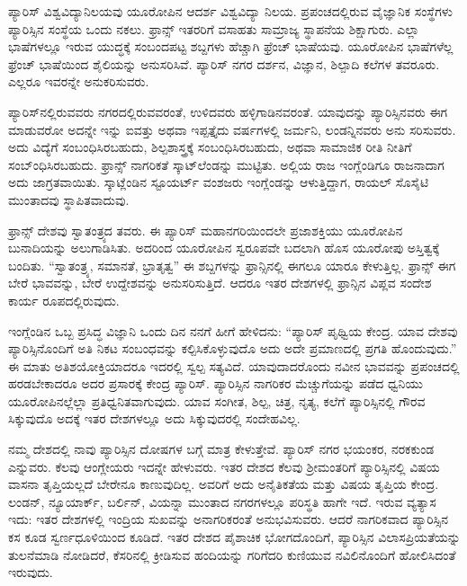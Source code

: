 \vskip 5pt

ಪ್ಯಾರಿಸ್​ ವಿಶ್ವವಿದ್ಯಾನಿಲಯವು ಯೂರೋಪಿನ ಆದರ್ಶ ವಿಶ್ವವಿದ್ಯಾ ನಿಲಯ. ಪ್ರಪಂಚದಲ್ಲಿರುವ ವೈಜ್ಞಾನಿಕ ಸಂಸ್ಥೆಗಳು ಪ್ಯಾರಿಸ್ಸಿನ ಸಂಸ್ಥೆಯ ಒಂದು ನಕಲು. ಫ್ರಾನ್ಸ್​ ಇತರರಿಗೆ ವಸಾಹತು ಸಾಮ್ರಾಜ್ಯ ಸ್ಥಾಪನೆಯ ಶಿಕ್ಷಾಗುರು. ಎಲ್ಲಾ ಭಾಷೆಗಳಲ್ಲೂ ಇರುವ ಯುದ್ಧಕ್ಕೆ ಸಂಬಂದಪಟ್ಟ ಶಬ್ದಗಳು ಹೆಚ್ಚಾಗಿ ಫ್ರೆಂಚ್​ ಭಾಷೆಯವು. ಯೂರೋಪಿನ ಭಾಷೆಗಳೆಲ್ಲ ಫ್ರೆಂಚ್​ ಭಾಷೆಯಿಂದ ಶೈಲಿಯನ್ನು ಅನುಸರಿಸಿವೆ. ಪ್ಯಾರಿಸ್​ ನಗರ ದರ್ಶನ, ವಿಜ್ಞಾನ, ಶಿಲ್ಪಾದಿ ಕಲೆಗಳ ತವರೂರು. ಎಲ್ಲರೂ ಇವರನ್ನೇ ಅನುಕರಿಸುವರು.

\vskip 5pt

ಪ್ಯಾರಿಸ್​ನಲ್ಲಿರುವವರು ನಗರದಲ್ಲಿರುವವರಂತೆ, ಉಳಿದವರು ಹಳ್ಳಿಗಾಡಿನವರಂತೆ. ಯಾವುದನ್ನು ಪ್ಯಾರಿಸ್ಸಿನವರು ಈಗ ಮಾಡುವರೋ ಅದನ್ನೇ ಇನ್ನು ಐವತ್ತು ಅಥವಾ ಇಪ್ಪತ್ತೈದು ವರ್ಷಗಳಲ್ಲಿ ಜರ್ಮನಿ, ಲಂಡನ್ನಿನವರು ಅನು ಸರಿಸುವರು. ಅದು ವಿದ್ಯೆಗೆ ಸಂಬಂಧಿಸಿರಬಹುದು, ಶಿಲ್ಪಶಾಸ್ತ್ರಕ್ಕೆ ಸಂಬಂಧಿಸಿರಬಹುದು, ಅಥವಾ ಸಾಮಾಜಿಕ ರೀತಿ ನೀತಿಗೆ ಸಂಬ್ಂಧಿಸಿರಬಹುದು. ಫ್ರಾನ್ಸ್​ ನಾಗರಿಕತೆ ಸ್ಕಾಟ್​ಲೆಂಡನ್ನು ಮುಟ್ಟಿತು. ಅಲ್ಲಿಯ ರಾಜ ಇಂಗ್ಲೆಂಡಿಗೂ ರಾಜನಾದಾಗ ಅದು ಜಾಗ್ರತವಾಯಿತು. ಸ್ಕಾಟ್ಲೆಂಡಿನ ಸ್ಟೂಯರ್ಟ್ ವಂಶಜರು ಇಂಗ್ಲೆಂಡನ್ನು ಆಳುತ್ತಿದ್ದಾಗ, ರಾಯಲ್​ ಸೊಸೈಟಿ ಮುಂತಾದವು ಸ್ಥಾಪಿತ\break ವಾದುವು.

ಫ್ರಾನ್ಸ್​ ದೇಶವು ಸ್ವಾತಂತ್ರ್ಯದ ತವರು. ಈ ಪ್ಯಾರಿಸ್​ ಮಹಾನಗರಿಯಿಂದಲೇ ಪ್ರಜಾ\break ಶಕ್ತಿಯು ಯೂರೋಪಿನ ಬುನಾದಿಯನ್ನು ಅಲುಗಾಡಿಸಿತು. ಅದರಿಂದ ಯೂರೋಪಿನ ಸ್ವರೂಪವೇ ಬದಲಾಗಿ ಹೊಸ ಯೂರೋಪು ಅಸ್ತಿತ್ವಕ್ಕೆ ಬಂದಿತು. “ಸ್ವಾತಂತ್ರ್ಯ, ಸಮಾನತೆ, ಭ್ರಾತೃತ್ವ” ಈ ಶಬ್ದಗಳನ್ನು ಫ್ರಾನ್ಸಿನಲ್ಲಿ ಈಗಲೂ ಯಾರೂ ಕೇಳುತ್ತಿಲ್ಲ. ಫ್ರಾನ್ಸ್​ ಈಗ ಬೇರೆ ಭಾವವನ್ನು, ಬೇರೆ ಉದ್ದೇಶವನ್ನು ಅನುಸರಿಸುತ್ತಿದೆ. ಆದರೂ ಇತರ ದೇಶಗಳಲ್ಲಿ ಫ್ರಾನ್ಸಿನ ವಿಪ್ಲವ ಸಂದೇಶ ಕಾರ್ಯ ರೂಪದಲ್ಲಿರುವುದು.

ಇಂಗ್ಲೆಂಡಿನ ಒಬ್ಬ ಪ್ರಸಿದ್ಧ ವಿಜ್ಞಾನಿ ಒಂದು ದಿನ ನನಗೆ ಹೀಗೆ ಹೇಳಿದನು: “ಪ್ಯಾರಿಸ್​ ಪೃಥ್ವಿಯ ಕೇಂದ್ರ. ಯಾವ ದೇಶವು ಪ್ಯಾರಿಸ್ಸಿನೊಂದಿಗೆ ಅತಿ ನಿಕಟ ಸಂಬಂಧವನ್ನು ಕಲ್ಪಿಸಿಕೊಳ್ಳುವುದೊ ಅದು ಅದೇ ಪ್ರಮಾಣದಲ್ಲಿ ಪ್ರಗತಿ ಹೊಂದುವುದು.” ಈ ಮಾತು ಅತಿಶಯೋಕ್ತಿಯಾದರೂ ಇದರಲ್ಲಿ ಸ್ವಲ್ಪ ಸತ್ಯವಿದೆ. ಯಾವುದಾದರೊಂದು ನವೀನ ಭಾವವನ್ನು ಪ್ರಪಂಚದಲ್ಲಿ ಹರಡಬೇಕಾದರೂ ಅದರ ಪ್ರಸಾರಕ್ಕೆ ಕೇಂದ್ರ ಪ್ಯಾರಿಸ್​. ಪ್ಯಾರಿಸ್ಸಿನ ನಾಗರಿಕರ ಮೆಚ್ಚುಗೆಯನ್ನು ಪಡೆದ ಧ್ವನಿಯು ಯೂರೋಪಿನಲ್ಲೆಲ್ಲಾ ಪ್ರತಿಧ್ವನಿತವಾಗು\break ವುದು. ಯಾವ ಸಂಗೀತ, ಶಿಲ್ಪ, ಚಿತ್ರ, ನೃತ್ಯ, ಕಲೆಗೆ ಪ್ಯಾರಿಸ್ಸಿನಲ್ಲಿ ಗೌರವ ಸಿಕ್ಕುವುದೊ ಅದಕ್ಕೆ ಇತರ ದೇಶಗಳಲ್ಲೂ ಅದು ಸಿಕ್ಕುವುದರಲ್ಲಿ ಸಂದೇಹವಿಲ್ಲ.

ನಮ್ಮ ದೇಶದಲ್ಲಿ ನಾವು ಪ್ಯಾರಿಸ್ಸಿನ ದೋಷಗಳ ಬಗ್ಗೆ ಮಾತ್ರ ಕೇಳುತ್ತೇವೆ. ಪ್ಯಾರಿಸ್​ ನಗರ ಭಯಂಕರ, ನರಕಕುಂಡ ಎನ್ನುವರು. ಕೆಲವು ಆಂಗ್ಲೇಯರು ಇದನ್ನೇ ಹೇಳುವರು. ಇತರ ದೇಶದ ಕೆಲವು ಶ‍್ರೀಮಂತರಿಗೆ ಪ್ಯಾರಿಸ್ಸಿನಲ್ಲಿ ವಿಷಯ ವಾಸನಾ ತೃಪ್ತಿಯಲ್ಲದೆ ಬೇರೇನೂ ಕಾಣುವುದಿಲ್ಲ. ಅವರಿಗೆ ಅದು ಅನೈತಿಕತೆಯ ಮತ್ತು ವಿಷಯ ತೃಪ್ತಿಯ ಕೇಂದ್ರ. ಲಂಡನ್​, ನ್ಯೂಯಾರ್ಕ್​, ಬರ್ಲಿನ್​, ವಿಯನ್ನಾ ಮುಂತಾದ ನಗರಗಳಲ್ಲೂ ಪರಿಸ್ಥತಿ ಹಾಗೇ ಇದೆ. ಇರುವ ವ್ಯತ್ಯಾಸ ಇದು: ಇತರ ದೇಶಗಳಲ್ಲಿ ಇಂದ್ರಿಯ ಸುಖವನ್ನು ಅನಾಗರಿಕರಂತೆ ಅನುಭವಿಸುವರು. ಆದರೆ ನಾಗರಿಕವಾದ ಪ್ಯಾರಿಸ್ಸಿನ ಕಸ ಕೂಡ ಸ್ವರ್ಣಧೂಳಿಯಿಂದ ಕೂಡಿದೆ. ಇತರ ದೇಶದ ಪೈಶಾಚಿಕ ಭೋಗದೊಂದಿಗೆ, ಪ್ಯಾರಿಸ್ಸಿನ ವಿಲಾಸಪ್ರಿಯತೆಯನ್ನು ತುಲನೆಮಾಡಿ ನೋಡಿದರೆ, ಕೆಸರಿನಲ್ಲಿ ಕ್ರೀಡಿಸುವ ಹಂದಿಯನ್ನು ಗರಿಗೆದರಿ ಕುಣಿಯುವ ನವಿಲಿನೊಂದಿಗೆ ಹೋಲಿಸಿದಂತೆ ಇರುವುದು.


